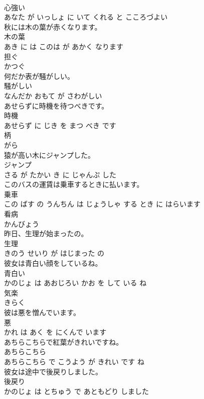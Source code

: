 \documentclass[8pt]{extreport}
\begin{document}
\begin{CJK}{UTF8}{min}
\\	心強い 
\\	あなた が いっしょ に いて くれる と こころづよい			
\\	秋には木の葉が赤くなります。	
\\	木の葉 
\\	あき に は このは が あかく なります			
\\	担ぐ	
\\	かつぐ		
\\	何だか表が騒がしい。	
\\	騒がしい 
\\	なんだか おもて が さわがしい			
\\	あせらずに時機を待つべきです。	
\\	時機 
\\	あせらず に じき を まつ べき です			
\\	柄	
\\	がら		
\\	猿が高い木にジャンプした。	
\\	ジャンプ 
\\	さる が たかい き に じゃんぷ した			
\\	このバスの運賃は乗車するときに払います。	
\\	乗車 
\\	この ばす の うんちん は じょうしゃ する とき に はらいます			
\\	看病	
\\	かんびょう		
\\	昨日、生理が始まったの。	
\\	生理 
\\	きのう せいり が はじまった の			
\\	彼女は青白い顔をしているね。	
\\	青白い 
\\	かのじょ は あおじろい かお を して いる ね			
\\	気楽	
\\	きらく		
\\	彼は悪を憎んでいます。	
\\	悪 
\\	かれ は あく を にくんで います			
\\	あちらこちらで紅葉がきれいですね。	
\\	あちらこちら 
\\	あちらこちら で こうよう が きれい です ね			
\\	彼女は途中で後戻りしました。	
\\	後戻り 
\\	かのじょ は とちゅう で あともどり しました			

\end{CJK}
\end{document}
